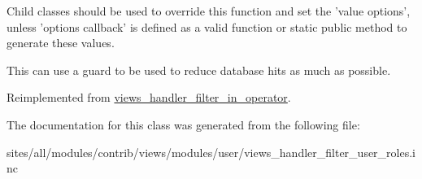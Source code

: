 Child classes should be used to override this function and set the 'value options', unless 'options callback' is defined as a valid function or static public method to generate these values.

This can use a guard to be used to reduce database hits as much as possible. 

Reimplemented from \hyperlink{classviews__handler__filter__in__operator_a5b5df6d90f4359ed28c0c446bdc81a6}{views\_\-handler\_\-filter\_\-in\_\-operator}.

The documentation for this class was generated from the following file:\begin{CompactItemize}
\item 
sites/all/modules/contrib/views/modules/user/views\_\-handler\_\-filter\_\-user\_\-roles.inc\end{CompactItemize}
